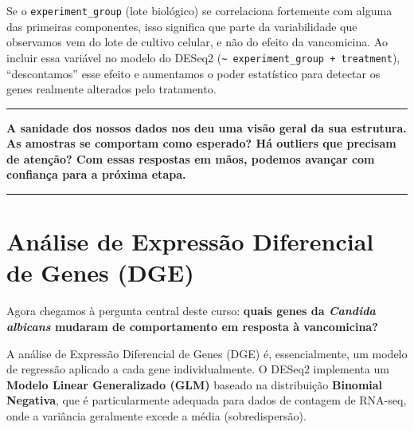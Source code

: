 \documentclass[
  letterpaper,
  DIV=11,
  numbers=noendperiod]{scrreprt}
\begin{document}
\begin{tcolorbox}[enhanced jigsaw, arc=.35mm, bottomrule=.15mm, bottomtitle=1mm, breakable, colback=white, colbacktitle=quarto-callout-important-color!10!white, colframe=quarto-callout-important-color-frame, coltitle=black, left=2mm, leftrule=.75mm, opacityback=0, opacitybacktitle=0.6, rightrule=.15mm, title=\textcolor{quarto-callout-important-color}{\faExclamation}\hspace{0.5em}{Por que incluir covariáveis?}, titlerule=0mm, toprule=.15mm, toptitle=1mm]

Se o \texttt{experiment\_group} (lote biológico) se correlaciona
fortemente com alguma das primeiras componentes, isso significa que
parte da variabilidade que observamos vem do lote de cultivo celular, e
não do efeito da vancomicina. Ao incluir essa variável no modelo do
DESeq2 (\texttt{\textasciitilde{}\ experiment\_group\ +\ treatment}),
``descontamos'' esse efeito e aumentamos o poder estatístico para
detectar os genes realmente alterados pelo tratamento.

\end{tcolorbox}

\begin{center}\rule{0.5\linewidth}{0.5pt}\end{center}

\textbf{A sanidade dos nossos dados nos deu uma visão geral da sua
estrutura. As amostras se comportam como esperado? Há outliers que
precisam de atenção? Com essas respostas em mãos, podemos avançar com
confiança para a próxima etapa.}

\begin{center}\rule{0.5\linewidth}{0.5pt}\end{center}

\section{Análise de Expressão Diferencial de Genes
(DGE)}\label{anuxe1lise-de-expressuxe3o-diferencial-de-genes-dge}

Agora chegamos à pergunta central deste curso: \textbf{quais genes da
\emph{Candida albicans} mudaram de comportamento em resposta à
vancomicina?}

A análise de Expressão Diferencial de Genes (DGE) é, essencialmente, um
modelo de regressão aplicado a cada gene individualmente. O DESeq2
implementa um \textbf{Modelo Linear Generalizado (GLM)} baseado na
distribuição \textbf{Binomial Negativa}, que é particularmente adequada
para dados de contagem de RNA-seq, onde a variância geralmente excede a
média (sobredispersão).
\end{document}
